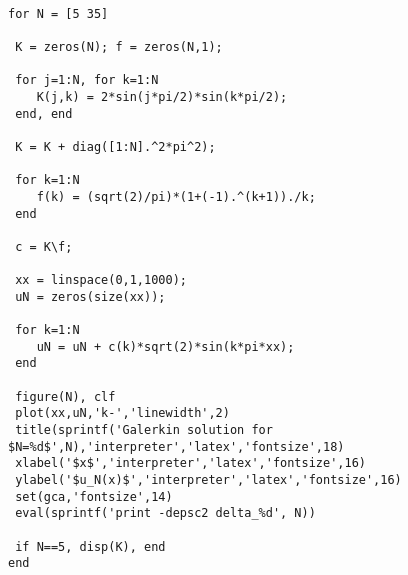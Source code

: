 {\footnotesize
\begin{verbatim}

for N = [5 35]

 K = zeros(N); f = zeros(N,1);

 for j=1:N, for k=1:N
    K(j,k) = 2*sin(j*pi/2)*sin(k*pi/2);
 end, end

 K = K + diag([1:N].^2*pi^2);

 for k=1:N
    f(k) = (sqrt(2)/pi)*(1+(-1).^(k+1))./k;
 end 

 c = K\f;

 xx = linspace(0,1,1000);
 uN = zeros(size(xx));

 for k=1:N
    uN = uN + c(k)*sqrt(2)*sin(k*pi*xx);
 end

 figure(N), clf
 plot(xx,uN,'k-','linewidth',2)
 title(sprintf('Galerkin solution for $N=%d$',N),'interpreter','latex','fontsize',18)
 xlabel('$x$','interpreter','latex','fontsize',16)
 ylabel('$u_N(x)$','interpreter','latex','fontsize',16)
 set(gca,'fontsize',14)
 eval(sprintf('print -depsc2 delta_%d', N))

 if N==5, disp(K), end
end
\end{verbatim}
}
